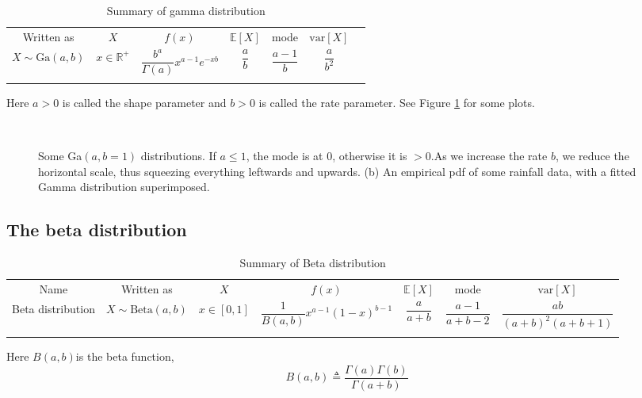 \begin{table}
\caption{Summary of gamma distribution}
\centering
\begin{tabular}{ccccccc}
\hline\noalign{\smallskip}
Written as & $X$ & $f(x)$ & $\mathbb{E}[X]$ & mode & $\text{var}[X]$ \\
\noalign{\smallskip}\svhline\noalign{\smallskip}
$X \sim \text{Ga}(a,b)$ & $x \in \mathbb{R}^+$ & $\dfrac{b^a}{\Gamma(a)}x^{a-1}e^{-xb}$ & $\dfrac{a}{b}$ & $\dfrac{a-1}{b}$ & $\dfrac{a}{b^2}$ \\
\noalign{\smallskip}\hline
\end{tabular}
\end{table} 

Here $a>0$ is called the shape parameter and $b>0$ is called the rate parameter. See Figure \ref{fig:gamma-distribution} for some plots.

\begin{figure}[hbtp]
\centering
{} \\
\caption{Some Ga$(a, b=1)$ distributions. If $a \leq 1$, the mode is at 0, otherwise it is $>0$.As we increase the rate $b$, we reduce the horizontal scale, thus squeezing everything leftwards and upwards. (b) An empirical pdf of some rainfall data, with a fitted Gamma distribution superimposed.}
\label{fig:gamma-distribution} 
\end{figure}


\subsection{The beta distribution}

\begin{table*}
\caption{Summary of Beta distribution}\label{tab:beta-distribution}
\centering
\begin{tabular}{ccccccc}
\hline\noalign{\smallskip}
Name & Written as & $X$ & $f(x)$ & $\mathbb{E}[X]$ & mode & $\text{var}[X]$ \\
\noalign{\smallskip}\svhline\noalign{\smallskip}
Beta distribution & $X \sim \text{Beta}(a,b)$ & $x \in [0,1]$ & $\dfrac{1}{B(a,b)}x^{a-1}(1-x)^{b-1}$ & $\dfrac{a}{a+b}$ & $\dfrac{a-1}{a+b-2}$ & $\dfrac{ab}{(a+b)^2(a+b+1)}$ \\
\noalign{\smallskip}\hline
\end{tabular}
\end{table*} 

Here $B(a, b)$is the beta function,
\begin{equation}
B(a,b) \triangleq \dfrac{\Gamma(a)\Gamma(b)}{\Gamma(a+b)}
\end{equation}

